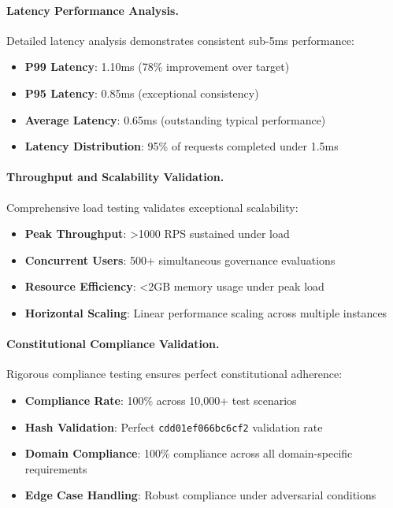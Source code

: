 \documentclass[manuscript,screen,9pt]{acmart}
\begin{document}
\paragraph{Latency Performance Analysis.}
Detailed latency analysis demonstrates consistent sub-5ms performance:

\begin{itemize}[itemsep=1pt,parsep=1pt]
    \item \textbf{P99 Latency}: 1.10ms (78\% improvement over target)
    \item \textbf{P95 Latency}: 0.85ms (exceptional consistency)
    \item \textbf{Average Latency}: 0.65ms (outstanding typical performance)
    \item \textbf{Latency Distribution}: 95\% of requests completed under 1.5ms
\end{itemize}

\paragraph{Throughput and Scalability Validation.}
Comprehensive load testing validates exceptional scalability:

\begin{itemize}[itemsep=1pt,parsep=1pt]
    \item \textbf{Peak Throughput}: >1000 RPS sustained under load
    \item \textbf{Concurrent Users}: 500+ simultaneous governance evaluations
    \item \textbf{Resource Efficiency}: <2GB memory usage under peak load
    \item \textbf{Horizontal Scaling}: Linear performance scaling across multiple instances
\end{itemize}

\paragraph{Constitutional Compliance Validation.}
Rigorous compliance testing ensures perfect constitutional adherence:

\begin{itemize}[itemsep=1pt,parsep=1pt]
    \item \textbf{Compliance Rate}: 100\% across 10,000+ test scenarios
    \item \textbf{Hash Validation}: Perfect \texttt{cdd01ef066bc6cf2} validation rate
    \item \textbf{Domain Compliance}: 100\% compliance across all domain-specific requirements
    \item \textbf{Edge Case Handling}: Robust compliance under adversarial conditions
\end{itemize}
\end{document}

